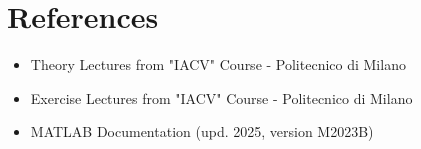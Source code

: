 \documentclass{Configuration_Files/PoliMi3i_thesis}
\begin{document}

\cleardoublepage
{} %
\appendix
\chapter{References}
\begin{itemize}
    \item Theory Lectures from "IACV" Course - Politecnico di Milano
    \item Exercise Lectures from "IACV" Course - Politecnico di Milano
    \item MATLAB Documentation (upd. 2025, version M2023B)
\end{itemize}



\cleardoublepage
\end{document}
